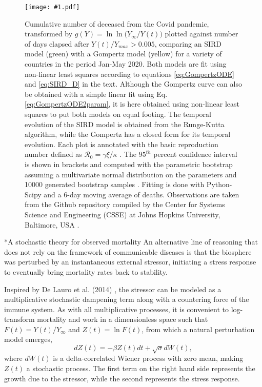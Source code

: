 \documentclass{article}
\newcommand{\insertPdfFig}[3]{
  \begin{figure}[H]
  \centering
  \texttt{[image: \#1.pdf]}
  \caption{#2}
  \label{fig:#1}
  \end{figure}
}
\begin{document}
\insertPdfFig{Gompertz_vs_SIRD_lnln_infty}{Cumulative number of deceased from the Covid pandemic, transformed by $g(Y)=\ln{\ln{({Y_{\infty} / Y(t))}}}$ plotted against number of days elapsed after $Y(t) / Y_{max}>0.005$, comparing an SIRD model (green) with a Gompertz model (yellow) for a variety of countries in the period Jan-May 2020. Both models are fit using non-linear least squares according to equations \ref{eq:GompertzODE} and \ref{eq:SIRD_D} in the text. Although the Gompertz curve can also be obtained with a simple linear fit using Eq. \ref{eq:GompertzODE2param}, it is here obtained using non-linear least squares to put both models on equal footing. The temporal evolution of the SIRD model is obtained from the Runge-Kutta algorithm, while the Gompertz has a closed form for its temporal evolution. Each plot is annotated with the basic reproduction number defined as $\mathcal{R}_0=\gamma\xi/\kappa$ \cite{carletti2020covid}. The $95^{th}$ percent confidence interval is shown in brackets and computed with the parametric bootstrap assuming a multivariate normal distribution on the parameters and 10000 generated bootstrap samples \cite{efron2012bayesian}. Fitting is done with Python-Scipy and a 6-day moving average of deaths. Observations are taken from the Github repository compiled by the Center for Systems Science and Engineering (CSSE) at Johns Hopkins University, Baltimore, USA \cite{dong2020interactive}.} 

\section*{A stochastic theory for observed mortality}
\label{seq:alt}
An alternative line of reasoning that does not rely on the framework of communicable diseases is that the biosphere was perturbed by an instantaneous external stressor, initiating a stress response to eventually bring mortality rates back to stability.

Inspired by De Lauro et al. (2014) \cite{de2014stochastic}, the stressor can be modeled as a multiplicative stochastic dampening term along with a countering force of the immune system. 
As with all multiplicative processes, it is convenient to log-transform mortality and work in a dimensionless space such that $F(t)=Y(t)/Y_\infty$ and $Z(t)=\ln{F}(t)$, from which a natural perturbation model emerges,
\begin{equation}
\label{eq:microscopic}
dZ(t)= -\beta Z(t) dt + \sqrt{\sigma}dW(t),
\end{equation}
where $dW(t)$ is a delta-correlated Wiener process with zero mean, making $Z(t)$ a stochastic process. The first term on the right hand side represents the growth due to the stressor, while the second represents the stress response.  
\end{document}

